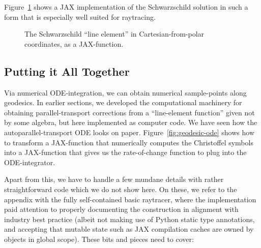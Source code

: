 \documentclass[twocolumn]{article}
\begin{document}
Figure~\ref{fig:jax-schwarzschild} shows a JAX implementation of the
Schwarzschild solution in such a form that is especially well suited
for raytracing.

\begin{figure}[ht]

\caption{The Schwarzschild ``line element'' in Cartesian-from-polar
  coordinates, as a JAX-function.}
\label{fig:jax-schwarzschild}
\end{figure}

\subsection{Putting it All Together}

Via numerical ODE-integration, we can obtain numerical sample-points
along geodesics. In earlier sections, we developed the computational
machinery for obtaining parallel-transport corrections from a
``line-element function'' given not by some algebra, but here
implemented as computer code. We have seen how the
autoparallel-transport ODE looks on paper.
Figure~\ref{fig:geodesic-ode} shows how to transform a JAX-function
that numerically computes the Christoffel symbols into a JAX-function
that gives us the rate-of-change function to plug into the ODE-integrator.

Apart from this, we have to handle a few mundane details with rather
straightforward code which we do not show here. On these, we refer to
the appendix with the fully self-contained basic raytracer, where the
implementation paid attention to properly documenting the construction
in alignment with industry best practice (albeit not making use of
Python static type annotations, and accepting that mutable state such
as JAX compilation caches are owned by objects in global scope). These
bits and pieces need to cover:
\end{document}
